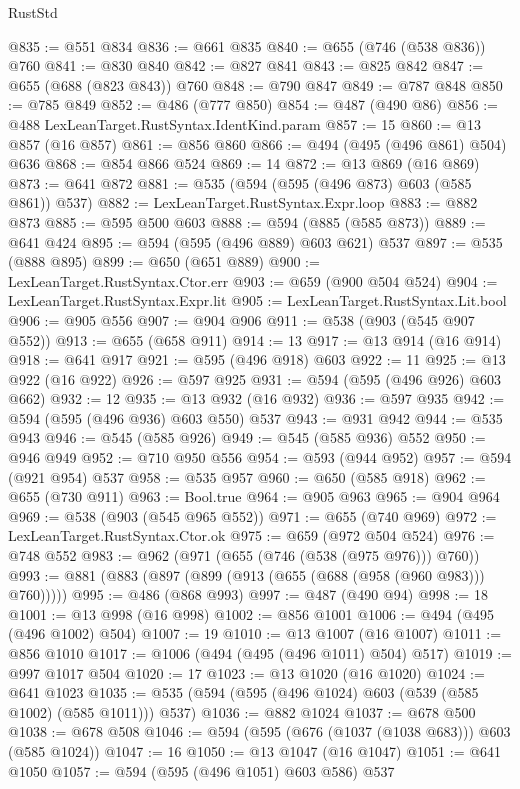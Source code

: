 \begin{lexlean}{RustStd}
\begin{coremodule}
@835 := @551 @834
@836 := @661 @835
@840 := @655 (@746 (@538 @836)) @760
@841 := @830 @840
@842 := @827 @841
@843 := @825 @842
@847 := @655 (@688 (@823 @843)) @760
@848 := @790 @847
@849 := @787 @848
@850 := @785 @849
@852 := @486 (@777 @850)
@854 := @487 (@490 @86)
@856 := @488 LexLeanTarget.RustSyntax.IdentKind.param
@857 := 15
@860 := @13 @857 (@16 @857)
@861 := @856 @860
@866 := @494 (@495 (@496 @861) @504) @636
@868 := @854 @866 @524
@869 := 14
@872 := @13 @869 (@16 @869)
@873 := @641 @872
@881 := @535 (@594 (@595 (@496 @873) @603 (@585 @861)) @537)
@882 := LexLeanTarget.RustSyntax.Expr.loop
@883 := @882 @873
@885 := @595 @500 @603
@888 := @594 (@885 (@585 @873))
@889 := @641 @424
@895 := @594 (@595 (@496 @889) @603 @621) @537
@897 := @535 (@888 @895)
@899 := @650 (@651 @889)
@900 := LexLeanTarget.RustSyntax.Ctor.err
@903 := @659 (@900 @504 @524)
@904 := LexLeanTarget.RustSyntax.Expr.lit
@905 := LexLeanTarget.RustSyntax.Lit.bool
@906 := @905 @556
@907 := @904 @906
@911 := @538 (@903 (@545 @907 @552))
@913 := @655 (@658 @911)
@914 := 13
@917 := @13 @914 (@16 @914)
@918 := @641 @917
@921 := @595 (@496 @918) @603
@922 := 11
@925 := @13 @922 (@16 @922)
@926 := @597 @925
@931 := @594 (@595 (@496 @926) @603 @662)
@932 := 12
@935 := @13 @932 (@16 @932)
@936 := @597 @935
@942 := @594 (@595 (@496 @936) @603 @550) @537
@943 := @931 @942
@944 := @535 @943
@946 := @545 (@585 @926)
@949 := @545 (@585 @936) @552
@950 := @946 @949
@952 := @710 @950 @556
@954 := @593 (@944 @952)
@957 := @594 (@921 @954) @537
@958 := @535 @957
@960 := @650 (@585 @918)
@962 := @655 (@730 @911)
@963 := Bool.true
@964 := @905 @963
@965 := @904 @964
@969 := @538 (@903 (@545 @965 @552))
@971 := @655 (@740 @969)
@972 := LexLeanTarget.RustSyntax.Ctor.ok
@975 := @659 (@972 @504 @524)
@976 := @748 @552
@983 := @962 (@971 (@655 (@746 (@538 (@975 @976))) @760))
@993 := @881 (@883 (@897 (@899 (@913 (@655 (@688 (@958 (@960 @983))) @760)))))
@995 := @486 (@868 @993)
@997 := @487 (@490 @94)
@998 := 18
@1001 := @13 @998 (@16 @998)
@1002 := @856 @1001
@1006 := @494 (@495 (@496 @1002) @504)
@1007 := 19
@1010 := @13 @1007 (@16 @1007)
@1011 := @856 @1010
@1017 := @1006 (@494 (@495 (@496 @1011) @504) @517)
@1019 := @997 @1017 @504
@1020 := 17
@1023 := @13 @1020 (@16 @1020)
@1024 := @641 @1023
@1035 := @535 (@594 (@595 (@496 @1024) @603 (@539 (@585 @1002) (@585 @1011))) @537)
@1036 := @882 @1024
@1037 := @678 @500
@1038 := @678 @508
@1046 := @594 (@595 (@676 (@1037 (@1038 @683))) @603 (@585 @1024))
@1047 := 16
@1050 := @13 @1047 (@16 @1047)
@1051 := @641 @1050
@1057 := @594 (@595 (@496 @1051) @603 @586) @537

\end{coremodule}
\end{lexlean}
